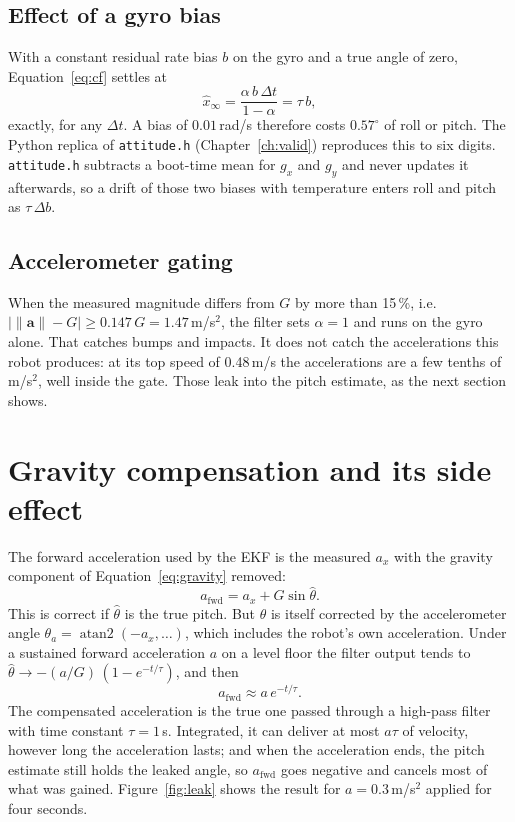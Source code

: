 \documentclass[11pt,a4paper]{report}
\newcommand{\code}[1]{\texttt{#1}}
\begin{document}
\subsection{Effect of a gyro bias}
With a constant residual rate bias $b$ on the gyro and a true angle of zero, Equation~\eqref{eq:cf} settles at
\begin{equation}
  \hat x_\infty=\frac{\alpha\,b\,\Delta t}{1-\alpha}=\tau\,b, \label{eq:cfbias}
\end{equation}
exactly, for any $\Delta t$. A bias of $0.01$\,rad/s therefore costs $0.57^\circ$ of roll or pitch. The Python replica of \code{attitude.h} (Chapter~\ref{ch:valid}) reproduces this to six digits. \code{attitude.h} subtracts a boot-time mean for $g_x$ and $g_y$ and never updates it afterwards, so a drift of those two biases with temperature enters roll and pitch as $\tau\,\Delta b$.

\subsection{Accelerometer gating}
When the measured magnitude differs from $G$ by more than 15\,\%, i.e.\ $|\lVert\mathbf a\rVert-G|\ge0.147\,G=1.47$\,m/s$^2$, the filter sets $\alpha=1$ and runs on the gyro alone. That catches bumps and impacts. It does not catch the accelerations this robot produces: at its top speed of 0.48\,m/s the accelerations are a few tenths of m/s$^2$, well inside the gate. Those leak into the pitch estimate, as the next section shows.

\section{Gravity compensation and its side effect}\label{sec:leak}
The forward acceleration used by the EKF is the measured $a_x$ with the gravity component of Equation~\eqref{eq:gravity} removed:
\begin{equation}
  a_{\mathrm{fwd}}=a_x+G\sin\hat\theta. \label{eq:afwd}
\end{equation}
This is correct if $\hat\theta$ is the true pitch. But $\hat\theta$ is itself corrected by the accelerometer angle $\theta_a=\operatorname{atan2}(-a_x,\dots)$, which includes the robot's own acceleration. Under a sustained forward acceleration $a$ on a level floor the filter output tends to $\hat\theta\to-(a/G)\,(1-e^{-t/\tau})$, and then
\begin{equation}
  a_{\mathrm{fwd}}\approx a\,e^{-t/\tau}. \label{eq:leak}
\end{equation}
The compensated acceleration is the true one passed through a high-pass filter with time constant $\tau=1$\,s. Integrated, it can deliver at most $a\tau$ of velocity, however long the acceleration lasts; and when the acceleration ends, the pitch estimate still holds the leaked angle, so $a_{\mathrm{fwd}}$ goes negative and cancels most of what was gained. Figure~\ref{fig:leak} shows the result for $a=0.3$\,m/s$^2$ applied for four seconds.
\end{document}
